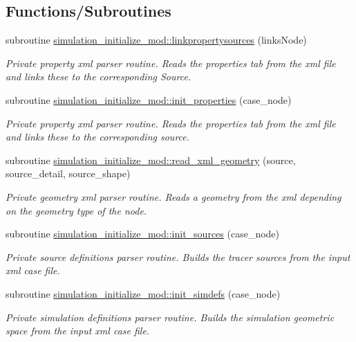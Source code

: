 \subsection*{Functions/\+Subroutines}
\begin{DoxyCompactItemize}
\item 
subroutine \mbox{\hyperlink{namespacesimulation__initialize__mod_a695ed61242e902d50bc40b83a6d11f65}{simulation\+\_\+initialize\+\_\+mod\+::linkpropertysources}} (links\+Node)
\begin{DoxyCompactList}\small\item\em Private property xml parser routine. Reads the properties tab from the xml file and links these to the corresponding Source. \end{DoxyCompactList}\item 
subroutine \mbox{\hyperlink{namespacesimulation__initialize__mod_a7b30af4cf1a6ee74a4b2c6e8c9d1d98d}{simulation\+\_\+initialize\+\_\+mod\+::init\+\_\+properties}} (case\+\_\+node)
\begin{DoxyCompactList}\small\item\em Private property xml parser routine. Reads the properties tab from the xml file and links these to the corresponding source. \end{DoxyCompactList}\item 
subroutine \mbox{\hyperlink{namespacesimulation__initialize__mod_ab6e350f9f537c9f62e8ba5aeb023d2a6}{simulation\+\_\+initialize\+\_\+mod\+::read\+\_\+xml\+\_\+geometry}} (source, source\+\_\+detail, source\+\_\+shape)
\begin{DoxyCompactList}\small\item\em Private geometry xml parser routine. Reads a geometry from the xml depending on the geometry type of the node. \end{DoxyCompactList}\item 
subroutine \mbox{\hyperlink{namespacesimulation__initialize__mod_ae89df4e3074d9624a7db2bc015545d8d}{simulation\+\_\+initialize\+\_\+mod\+::init\+\_\+sources}} (case\+\_\+node)
\begin{DoxyCompactList}\small\item\em Private source definitions parser routine. Builds the tracer sources from the input xml case file. \end{DoxyCompactList}\item 
subroutine \mbox{\hyperlink{namespacesimulation__initialize__mod_ae4a495136e5f02724a5cc456d5884281}{simulation\+\_\+initialize\+\_\+mod\+::init\+\_\+simdefs}} (case\+\_\+node)
\begin{DoxyCompactList}\small\item\em Private simulation definitions parser routine. Builds the simulation geometric space from the input xml case file. \end{DoxyCompactList}\item 

\end{DoxyCompactItemize}
